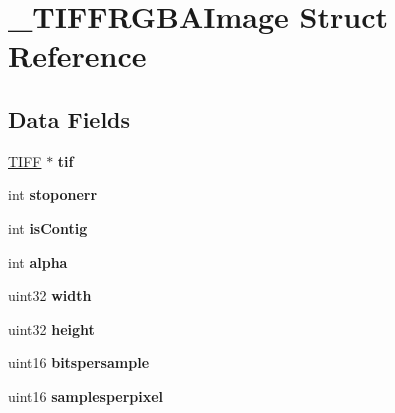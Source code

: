 \hypertarget{struct___t_i_f_f_r_g_b_a_image}{}\section{\+\_\+\+T\+I\+F\+F\+R\+G\+B\+A\+Image Struct Reference}
\label{struct___t_i_f_f_r_g_b_a_image}
\subsection*{Data Fields}
\begin{DoxyCompactItemize}
\item 
\hypertarget{struct___t_i_f_f_r_g_b_a_image_a99b0269132177076cbf0defe0e08ab28}{}\hyperlink{structtiff}{T\+I\+F\+F} $\ast$ {\bfseries tif}\label{struct___t_i_f_f_r_g_b_a_image_a99b0269132177076cbf0defe0e08ab28}

\item 
\hypertarget{struct___t_i_f_f_r_g_b_a_image_a13b186a0cd869b181f17949e90e2665c}{}int {\bfseries stoponerr}\label{struct___t_i_f_f_r_g_b_a_image_a13b186a0cd869b181f17949e90e2665c}

\item 
\hypertarget{struct___t_i_f_f_r_g_b_a_image_a5faa4bd9dbc7b86938ffca4065ace5f5}{}int {\bfseries is\+Contig}\label{struct___t_i_f_f_r_g_b_a_image_a5faa4bd9dbc7b86938ffca4065ace5f5}

\item 
\hypertarget{struct___t_i_f_f_r_g_b_a_image_a98114e5c7c81b3f2003b0a4024bd41f7}{}int {\bfseries alpha}\label{struct___t_i_f_f_r_g_b_a_image_a98114e5c7c81b3f2003b0a4024bd41f7}

\item 
\hypertarget{struct___t_i_f_f_r_g_b_a_image_a9ddae86018522bf2d708066884d89b3c}{}uint32 {\bfseries width}\label{struct___t_i_f_f_r_g_b_a_image_a9ddae86018522bf2d708066884d89b3c}

\item 
\hypertarget{struct___t_i_f_f_r_g_b_a_image_ad6796376ef5cc027ed35c4b2dd170f41}{}uint32 {\bfseries height}\label{struct___t_i_f_f_r_g_b_a_image_ad6796376ef5cc027ed35c4b2dd170f41}

\item 
\hypertarget{struct___t_i_f_f_r_g_b_a_image_a082f94bf73dd20283fed3e9eb5da63ae}{}uint16 {\bfseries bitspersample}\label{struct___t_i_f_f_r_g_b_a_image_a082f94bf73dd20283fed3e9eb5da63ae}

\item 
\hypertarget{struct___t_i_f_f_r_g_b_a_image_a4f2b3517b8e66bf28644d6af3df7a347}{}uint16 {\bfseries samplesperpixel}\label{struct___t_i_f_f_r_g_b_a_image_a4f2b3517b8e66bf28644d6af3df7a347}


\end{DoxyCompactItemize}
